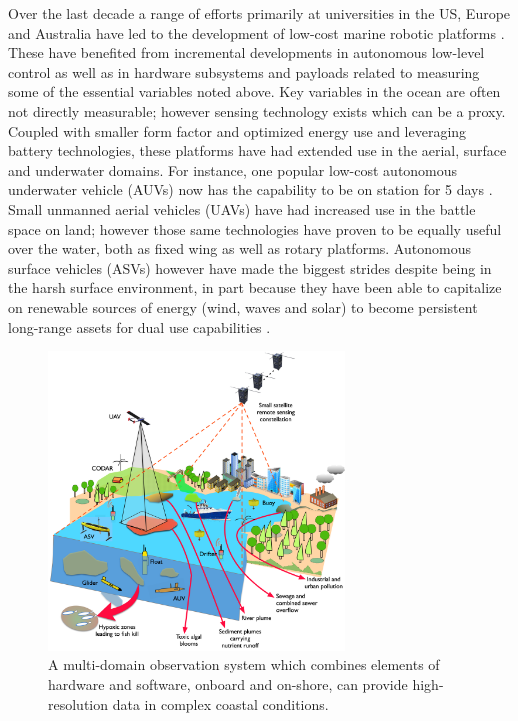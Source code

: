 Over the last decade a range of efforts primarily at universities in
the US, Europe and Australia have led to the development of low-cost
marine robotic platforms \cite{sousa2012lauv,pinto2013lsts}. These have benefited from
incremental developments in autonomous low-level control \cite{} as
well as in hardware subsystems and payloads related to measuring some
of the essential variables noted above. Key variables in the ocean are
often not directly measurable; however sensing technology exists which
can be a proxy. Coupled with smaller form factor and optimized energy
use and leveraging battery technologies, these platforms have had
extended use in the aerial, surface and underwater domains. For
instance, one popular low-cost autonomous underwater vehicle (AUVs)
now has the capability to be on station for 5 days \cite{}. Small
unmanned aerial vehicles (UAVs) have had increased use in the battle
space on land; however those same technologies have proven to be
equally useful over the water, both as fixed wing as well as rotary
platforms. Autonomous surface vehicles (ASVs) however have made the
biggest strides despite being in the harsh surface environment, in
part because they have been able to capitalize on renewable sources of
energy (wind, waves and solar) to become persistent long-range assets
for dual use capabilities \cite{}.

\begin{figure}[!t]
  \centering
  \includegraphics[width=0.7\textwidth]{fig/Meteor-Fig-1.jpg}
  \caption{A multi-domain observation system which combines elements
    of hardware and software, onboard and on-shore, can provide
    high-resolution data in complex coastal conditions.}
  \label{fig:concept}
\end{figure}


